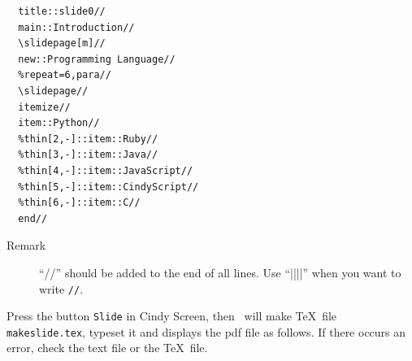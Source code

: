 \documentclass[papersize,a4paper,12pt]{article}
\begin{document}
\begin{verbatim}
  title::slide0//
  main::Introduction//
  \slidepage[m]//
  new::Programming Language//
  %repeat=6,para// 
  \slidepage// 
  itemize// 
  item::Python// 
  %thin[2,-]::item::Ruby// 
  %thin[3,-]::item::Java// 
  %thin[4,-]::item::JavaScript// 
  %thin[5,-]::item::CindyScript// 
  %thin[6,-]::item::C// 
  end// 
\end{verbatim}

\begin{description}
\item[Remark]``//'' should be added to the end of all lines. Use ``||||'' when you want to write \verb|//|.
\end{description}


Press the button \verb|Slide| in Cindy Screen, then \ketcindy\ will make \TeX\ file \verb|makeslide.tex|,
typeset it and displays the pdf file as follows. If there occurs an error, check the text file or the \TeX\ file.

\begin{center}
\hspace{5mm}%
\hspace{5mm}%
\hspace{5mm}%
\end{center}
\end{document}
